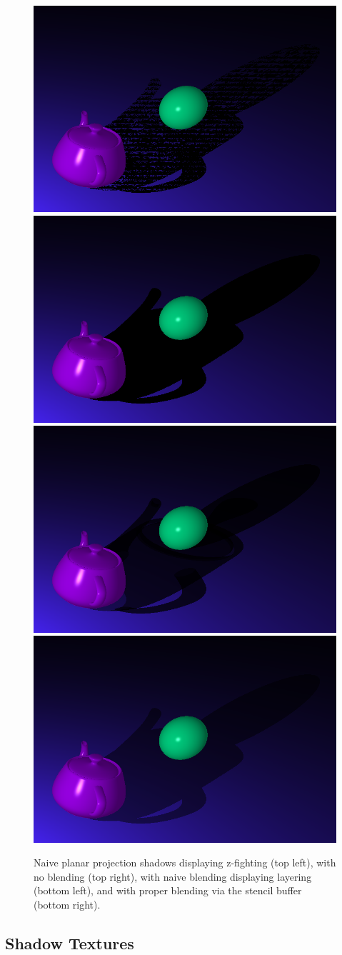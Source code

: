 \documentclass[acmsmall, screen, authorversion, nonacm]{acmart}
\begin{document}
\begin{figure}
	\includegraphics[width=.49\linewidth]{images/planar_1}\hfill
	\includegraphics[width=.49\linewidth]{images/planar_2}
	\\[\smallskipamount]
	\includegraphics[width=.49\linewidth]{images/planar_3}\hfill
	\includegraphics[width=.49\linewidth]{images/planar_4}
	\caption{Naive planar projection shadows displaying z-fighting (top left), with no blending (top right), with naive blending displaying layering (bottom left), and with proper blending via the stencil buffer (bottom right).}
\end{figure}

\subsection{Shadow Textures}
\end{document}
